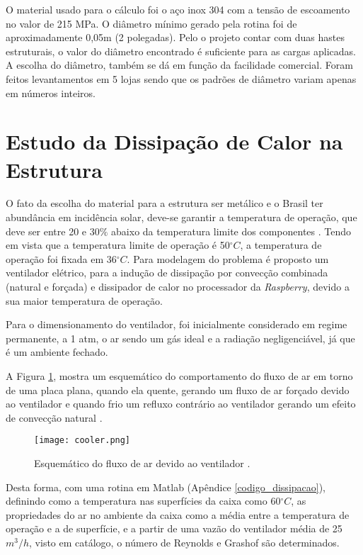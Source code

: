 O material usado para o cálculo foi o aço inox 304 com a tensão de escoamento no valor de 215 MPa. O diâmetro mínimo gerado pela rotina foi de aproximadamente 0,05m (2 polegadas). Pelo o projeto contar com duas hastes estruturais, o valor do diâmetro encontrado é suficiente para as cargas aplicadas. A escolha do diâmetro, também se dá em função da facilidade comercial. Foram feitos levantamentos em 5 lojas sendo que os padrões de diâmetro variam apenas em números inteiros.



\section{Estudo da Dissipação de Calor na Estrutura}

O fato da escolha do material para a estrutura ser metálico e o Brasil ter abundância em incidência solar, deve-se garantir a temperatura de operação, que deve ser entre 20 e $30\%$ abaixo da temperatura limite dos componentes \cite{temperatura}. Tendo em vista que a temperatura limite de operação é 50$^{\circ}C$, a temperatura de operação foi fixada em 36$^{\circ}C$. Para modelagem do problema é proposto um ventilador elétrico, para a indução de dissipação por convecção combinada (natural e forçada) e dissipador de calor no processador da \textit{Raspberry}, devido a sua maior temperatura de operação.

Para o dimensionamento do ventilador, foi inicialmente considerado em regime permanente, a 1 atm, o ar sendo um gás ideal e a radiação negligenciável, já que é um ambiente fechado.

A Figura \ref{cooler}, mostra um esquemático do comportamento do fluxo de ar em torno de uma placa plana, quando ela quente, gerando um fluxo de ar forçado devido ao ventilador e quando frio um refluxo contrário ao ventilador gerando um efeito de convecção natural \cite{livro_transcal}.

\begin{figure}[h]
	\centering
    \texttt{[image: cooler.png]}
    \caption{Esquemático do fluxo de ar devido ao ventilador \cite{livro_transcal}.}
    \label{cooler}
\end{figure}

Desta forma, com uma rotina em Matlab (Apêndice \ref{codigo_dissipacao}), definindo como a temperatura nas superfícies da caixa como 60$^{\circ}C$, as propriedades do ar no ambiente da caixa como a média entre a temperatura de operação e a de superfície, e a partir de uma vazão do ventilador média de 25$m^3/h$, visto em catálogo, o número de Reynolds e Grashof são determinados. 

